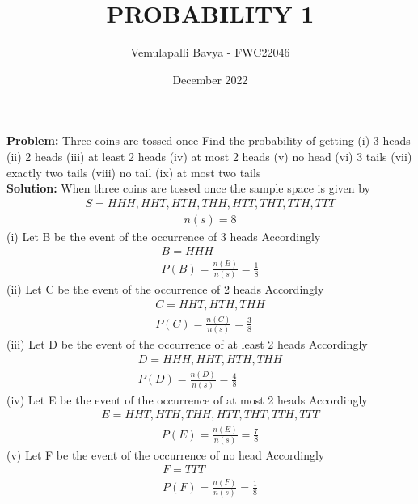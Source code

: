 \documentclass{article}
\newcommand{\Problem}{\noindent \textbf{Problem: }}
\newcommand{\solution}{\noindent \textbf{Solution: }}
\begin{document}
\title{\textbf{PROBABILITY 1}}
\author{Vemulapalli Bavya - FWC22046}
\date{December 2022}


\maketitle

\Problem Three coins are tossed once Find the probability of getting (i) 3 heads  (ii) 2 heads   (iii) at least 2 heads   (iv) at most 2 heads  (v) no head  (vi) 3 tails   (vii) exactly two tails  (viii) no tail  (ix) at most two tails\\

\solution
When three coins are tossed once the sample space is given by
\vspace{0.1cm}
\begin{align}
   S=HHH,HHT,HTH,THH,HTT,THT,TTH,TTT 
\end{align}
\begin{align}
    n(s) = 8
\end{align}
(i) Let B be the event of the occurrence of 3 heads Accordingly 
\begin{align}
    B=HHH\\
    P(B) = \frac{n(B)}{n(s)} = \frac{1}{8}
\end{align}
(ii) Let C be the event of the occurrence of 2 heads Accordingly
\begin{align}
    C=HHT,HTH,THH\\
    P(C) = \frac{n(C)}{n(s)} = \frac{3}{8}
\end{align}
(iii) Let D be the event of the occurrence of at least 2 heads
Accordingly \\
\begin{align}
    D=HHH,HHT,HTH,THH\\
    P(D) = \frac{n(D)}{n(s)} = \frac{4}{8}
\end{align}
(iv) Let E be the event of the occurrence of at most 2 heads
Accordingly \\
\begin{align}
    E=HHT,HTH,THH,HTT,THT,TTH,TTT
\end{align}
\begin{align}
    P(E) = \frac{n(E)}{n(s)} = \frac{7}{8}
\end{align}
(v) Let F be the event of the occurrence of no head
Accordingly\\
\begin{align}
    F=TTT\\
    P(F) = \frac{n(F)}{n(s)} = \frac{1}{8}
\end{align}
\end{document}
